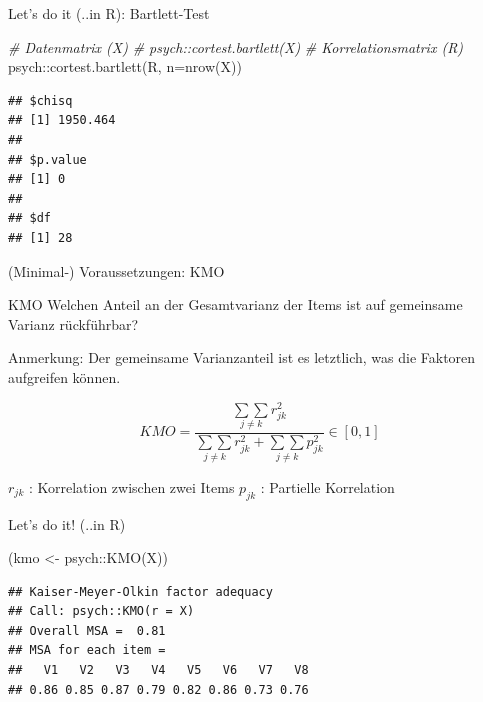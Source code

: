 \documentclass[
  ignorenonframetext,
]{beamer}
\newenvironment{Shaded}{\begin{snugshade}}{\end{snugshade}}
\newcommand{\AttributeTok}[1]{\textcolor[rgb]{0.77,0.63,0.00}{#1}}
\newcommand{\CommentTok}[1]{\textcolor[rgb]{0.56,0.35,0.01}{\textit{#1}}}
\newcommand{\FunctionTok}[1]{\textcolor[rgb]{0.00,0.00,0.00}{#1}}
\newcommand{\NormalTok}[1]{#1}
\newcommand{\OtherTok}[1]{\textcolor[rgb]{0.56,0.35,0.01}{#1}}
\newcommand{\SpecialCharTok}[1]{\textcolor[rgb]{0.00,0.00,0.00}{#1}}
\begin{document}
\begin{frame}[fragile]{Let's do it (..in R): Bartlett-Test}
\protect\hypertarget{lets-do-it-..in-r-bartlett-test}{}
\begin{Shaded}
\begin{Highlighting}[]
\CommentTok{\# Datenmatrix (X)}
\CommentTok{\# psych::cortest.bartlett(X)}
\CommentTok{\# Korrelationsmatrix (R)}
\NormalTok{psych}\SpecialCharTok{::}\FunctionTok{cortest.bartlett}\NormalTok{(R, }\AttributeTok{n=}\FunctionTok{nrow}\NormalTok{(X))}
\end{Highlighting}
\end{Shaded}

\begin{verbatim}
## $chisq
## [1] 1950.464
## 
## $p.value
## [1] 0
## 
## $df
## [1] 28
\end{verbatim}
\end{frame}

\begin{frame}{(Minimal-) Voraussetzungen: KMO}
\protect\hypertarget{minimal--voraussetzungen-kmo}{}
\begin{block}{KMO}
Welchen Anteil an der Gesamtvarianz der Items ist auf gemeinsame Varianz
rückführbar?
\end{block}

Anmerkung: Der gemeinsame Varianzanteil ist es letztlich, was die
Faktoren aufgreifen können.

\begin{equation}
KMO= \frac{\underset {j\neq k}{\sum \sum} r_{jk}^{2}}{\underset {j\neq k}{\sum \sum} r_{jk}^{2} + \underset {j\neq k}{\sum \sum} p_{jk}^{2}} \in [0,1]
\end{equation}

\(r_{jk}\) : Korrelation zwischen zwei Items \(p_{jk}\) : Partielle
Korrelation
\end{frame}

\begin{frame}[fragile]{Let's do it! (..in R)}
\protect\hypertarget{lets-do-it-..in-r}{}
\begin{Shaded}
\begin{Highlighting}[]
\NormalTok{(kmo }\OtherTok{\textless{}{-}}\NormalTok{ psych}\SpecialCharTok{::}\FunctionTok{KMO}\NormalTok{(X))}
\end{Highlighting}
\end{Shaded}

\begin{verbatim}
## Kaiser-Meyer-Olkin factor adequacy
## Call: psych::KMO(r = X)
## Overall MSA =  0.81
## MSA for each item = 
##   V1   V2   V3   V4   V5   V6   V7   V8 
## 0.86 0.85 0.87 0.79 0.82 0.86 0.73 0.76
\end{verbatim}

\begin{Shaded}
\end{Shaded}
\end{frame}
\end{document}

